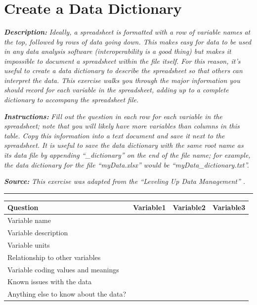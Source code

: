 \documentclass[
]{book}
\begin{document}
~

~

~

\hypertarget{data-dictionary}{%
\section{Create a Data Dictionary}\label{data-dictionary}}

\textbf{\emph{Description:}} \emph{Ideally, a spreadsheet is formatted with a row of variable names at the top, followed by rows of data going down. This makes easy for data to be used in any data analysis software (interoperability is a good thing) but makes it impossible to document a spreadsheet within the file itself. For this reason, it's useful to create a data dictionary to describe the spreadsheet so that others can interpret the data. This exercise walks you through the major information you should record for each variable in the spreadsheet, adding up to a complete dictionary to accompany the spreadsheet file.}

\textbf{\emph{Instructions:}} \emph{Fill out the question in each row for each variable in the spreadsheet; note that you will likely have more variables than columns in this table. Copy this information into a text document and save it next to the spreadsheet. It is useful to save the data dictionary with the same root name as its data file by appending ``\_dictionary'' on the end of the file name; for example, the data dictionary for the file ``myData.xlsx'' would be ``myData\_dictionary.txt''.}

\textbf{\emph{Source:}} \emph{This exercise was adapted from the ``Leveling Up Data Management'' \citep{briney_leveling_2023}.}

\begin{center}\rule{0.5\linewidth}{0.5pt}\end{center}

\begin{tabular}{l|l|l|l}
\hline
Question & Variable1 & Variable2 & Variable3\\
\hline
Variable name &  &  & \\
\hline
Variable description &  &  & \\
\hline
Variable units &  &  & \\
\hline
Relationship to other variables &  &  & \\
\hline
Variable coding values and meanings &  &  & \\
\hline
Known issues with the data &  &  & \\
\hline
Anything else to know about the data? &  &  & \\
\hline
\end{tabular}
\end{document}
